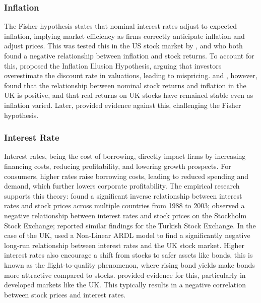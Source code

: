 \documentclass[11pt,a4paper]{article}
\newcommand{\citeboth}[1]{\citeauthor{#1} \citep{#1}}
\begin{document}
\subsubsection{Inflation}

The Fisher hypothesis states that nominal interest rates adjust to expected 
inflation, implying market efficiency as firms correctly anticipate inflation 
and adjust prices. This was tested this in the US stock market by \citeboth{jaffe1976}, and
\citeboth{bodie1976} who both found a negative relationship between inflation and stock returns.
To account for this,
\citeboth{mogdiliani1979} proposed the Inflation Illusion Hypothesis, 
arguing that investors overestimate the discount rate in valuations, leading to mispricing. 
\citeboth{gultekin1983} and \citeboth{firth1979}, however, found that the relationship between nominal stock returns and inflation in the UK is positive, and that real returns on UK stocks have remained stable even as inflation varied.
Later, \citeboth{hasan2008} provided evidence against this, challenging the Fisher hypothesis.

\subsubsection{Interest Rate}

Interest rates, being the cost of borrowing, directly impact firms by increasing financing costs, reducing profitability, and lowering growth prospects. For consumers, higher rates raise borrowing costs, leading to reduced spending and demand, which further lowers corporate profitability. 
The empirical research supports this theory: \citeboth{alam2009} found a significant inverse relationship between interest rates and stock prices across multiple countries from 1988 to 2003; 
\citeboth{talla2013} observed a negative relationship between interest rates and stock prices on the Stockholm Stock Exchange; 
\citeboth{demir2019} reported similar findings for the Turkish Stock Exchange. In the case of the UK, \citeboth{neifar2023} used a Non-Linear ARDL model to find a significantly negative long-run relationship between interest rates and the UK stock market. Higher interest rates also encourage a shift from stocks to safer 
assets like bonds, this is known as the flight-to-quality phenomenon, where rising bond yields make bonds more attractive compared to stocks. \citeboth{asgharian2016} provided evidence for this, particularly in developed markets like the UK. This typically results in a negative correlation between stock prices and interest rates.
\end{document}
